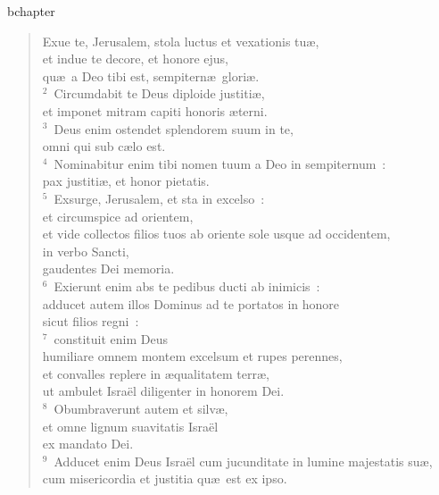bchapter\begin{flushleft}\begin{verse}\vspace{-19pt}Exue te, Jerusalem, stola luctus et vexationis tu\ae ,\\ et indue te decore, et honore ejus,\\ qu\ae\ a Deo tibi est, sempitern\ae\ glori\ae .\\
${}^{2}$~Circumdabit te Deus diploide justiti\ae ,\\ et imponet mitram capiti honoris \ae terni.\\
${}^{3}$~Deus enim ostendet splendorem suum in te,\\ omni qui sub c\ae lo est.\\
${}^{4}$~Nominabitur enim tibi nomen tuum a Deo in sempiternum~:\\ pax justiti\ae , et honor pietatis.\\
${}^{5}$~Exsurge, Jerusalem, et sta in excelso~:\\ et circumspice ad orientem,\\ et vide collectos filios tuos ab oriente sole usque ad occidentem,\\ in verbo Sancti,\\ gaudentes Dei memoria.\\
${}^{6}$~Exierunt enim abs te pedibus ducti ab inimicis~:\\ adducet autem illos Dominus ad te portatos in honore\\ sicut filios regni~:\\
${}^{7}$~constituit enim Deus\\ humiliare omnem montem excelsum et rupes perennes,\\ et convalles replere in \ae qualitatem terr\ae ,\\ ut ambulet Isra\"el diligenter in honorem Dei.\\
${}^{8}$~Obumbraverunt autem et silv\ae ,\\ et omne lignum suavitatis Isra\"el\\ ex mandato Dei.\\
${}^{9}$~Adducet enim Deus Isra\"el cum jucunditate in lumine majestatis su\ae ,\\ cum misericordia et justitia qu\ae\ est ex ipso.\end{verse}\end{flushleft}



